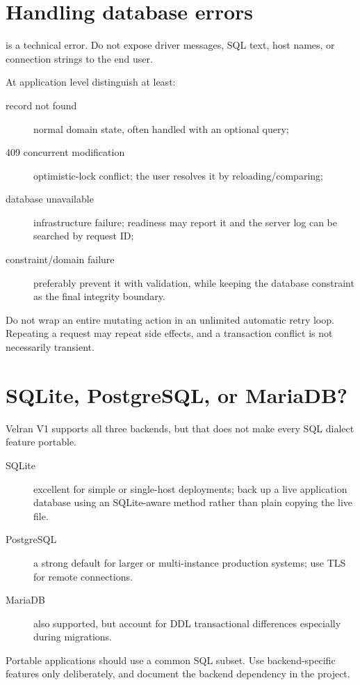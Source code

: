 \section{Handling database errors}

 is a technical error. Do not expose driver messages, SQL text, host names, or connection strings to the end user.

At application level distinguish at least:

\begin{description}
\item[record not found] normal domain state, often handled with an optional query;
\item[409 concurrent modification] optimistic-lock conflict; the user resolves it by reloading/comparing;
\item[database unavailable] infrastructure failure; readiness may report it and the server log can be searched by request ID;
\item[constraint/domain failure] preferably prevent it with validation, while keeping the database constraint as the final integrity boundary.
\end{description}

Do not wrap an entire mutating action in an unlimited automatic retry loop. Repeating a request may repeat side effects, and a transaction conflict is not necessarily transient.

\section{SQLite, PostgreSQL, or MariaDB?}

Velran V1 supports all three backends, but that does not make every SQL dialect feature portable.

\begin{description}
\item[SQLite] excellent for simple or single-host deployments; back up a live application database using an SQLite-aware method rather than plain copying the live file.
\item[PostgreSQL] a strong default for larger or multi-instance production systems; use TLS for remote connections.
\item[MariaDB] also supported, but account for DDL transactional differences especially during migrations.
\end{description}

Portable applications should use a common SQL subset. Use backend-specific features only deliberately, and document the backend dependency in the project.

